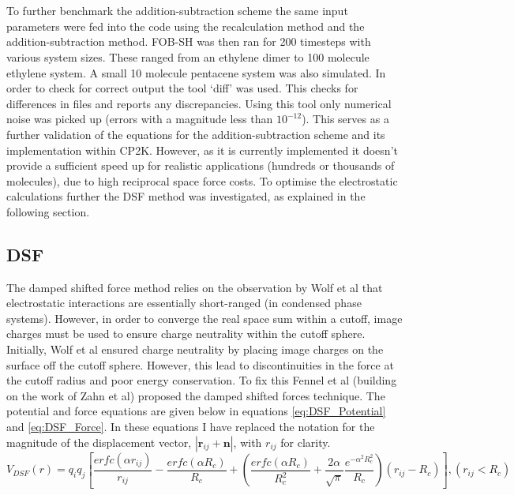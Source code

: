 \\\\
To further benchmark the addition-subtraction scheme the same input parameters were fed into the code using the recalculation method and the addition-subtraction method. FOB-SH was then ran for 200 timesteps with various system sizes. These ranged from an ethylene dimer to 100 molecule ethylene system. A small 10 molecule pentacene system was also simulated. In order to check for correct output the tool `diff' was used. This checks for differences in files and reports any discrepancies. Using this tool only numerical noise was picked up (errors with a magnitude less than $10^{-12}$). This serves as a further validation of the equations for the addition-subtraction scheme and its implementation within CP2K.  However, as it is currently implemented it doesn't provide a sufficient speed up for realistic applications (hundreds or thousands of molecules), due to high reciprocal space force costs. To optimise the electrostatic calculations further the DSF \cite{DSF} method was investigated, as explained in the following section.
\subsection{DSF}
The damped shifted force method relies on the observation by Wolf et al \cite{Wolf99} that electrostatic interactions are essentially short-ranged (in condensed phase systems). However, in order to converge the real space sum within a cutoff, image charges must be used to ensure charge neutrality within the cutoff sphere. Initially, Wolf et al ensured charge neutrality by placing image charges on the surface off the cutoff sphere. However, this lead to discontinuities in the force at the cutoff radius and poor energy conservation. To fix this Fennel et al (building on the work of Zahn et al) proposed the damped shifted forces technique. The potential and force equations are given below in equations \eqref{eq:DSF_Potential} and \eqref{eq:DSF_Force}. In these equations I have replaced the notation for the magnitude of the displacement vector, $|\mathbf{r}_{ij} + \mathbf{n}|$, with $r_{ij}$ for clarity.
\begin{equation}
	V_{DSF}(r) = q_{i} q_{j} \left[ \frac{erfc(\alpha r_{ij})}{r_{ij}}  - \frac{erfc(\alpha R_{c})}{R_{c}} + \left( \frac{erfc(\alpha R_{c})}{R_{c}^2} + \frac{2 \alpha}{\sqrt{\pi}} \frac{e^{-\alpha^2 R_{c}^2}}{R_{c}} \right) (r_{ij} - R_{c}) \right], (r_{ij} < R_{c})
  \label{eq:DSF_Potential}
\end{equation}


